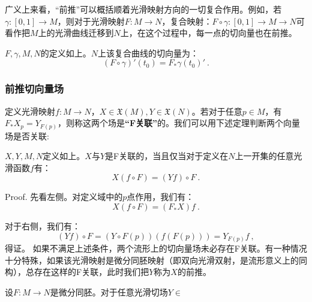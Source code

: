 广义上来看，“前推”可以概括顺着光滑映射方向的一切复合作用。例如，若$\gamma:[0,1]\rightarrow M$，则对于光滑映射$F:M\rightarrow N$，复合映射：$F\circ \gamma:[0,1]\rightarrow M\rightarrow N$可看作把$M$上的光滑曲线迁移到$N$上，在这个过程中，每一点的切向量也在前推。
\begin{lemma}{}
$F,\gamma,M,N$的定义如上。$N$上该复合曲线的切向量为：
\begin{equation}
(F\circ\gamma)'(t_0)=F_*\gamma(t_0)'~.
\end{equation}
\end{lemma}
\subsubsection{前推切向量场}
定义光滑映射$f:M\rightarrow N$，$X \in \mathfrak{X}(M),Y\in \mathfrak{X}(N)$。若对于任意$p\in M$，有$F_*X_p=Y_{F(p)}$，则称这两个场是\textbf{“F关联”}的。我们可以用下述定理判断两个向量场是否关联:
\begin{theorem}{}
$X,Y,M,N$定义如上。$X$与$Y$是F关联的，当且仅当对于定义在$N$上一开集的任意光滑函数$f$有：
\begin{equation}
X(f\circ F)=(Yf)\circ F~.
\end{equation}
\end{theorem}
Proof.
先看左侧。对定义域中的$p$点作用，我们有：
\begin{equation}
X(f\circ F)=(F_*X)f~.
\end{equation}

对于右侧，我们有：
\begin{equation}
(Yf)\circ F=(Y\circ F(p))(f (F(p)))=Y_{F(p)}f~,
\end{equation}
得证。
如果不满足上述条件，两个流形上的切向量场未必存在F关联。有一种情况十分特殊，如果该光滑映射是微分同胚映射（即双向光滑双射，是流形意义上的同构），总存在这样的F关联，此时我们把$Y$称为$X$的前推。
\begin{theorem}{}
设$F:M\rightarrow N$是微分同胚。对于任意光滑切场$Y\in $
\end{theorem}

